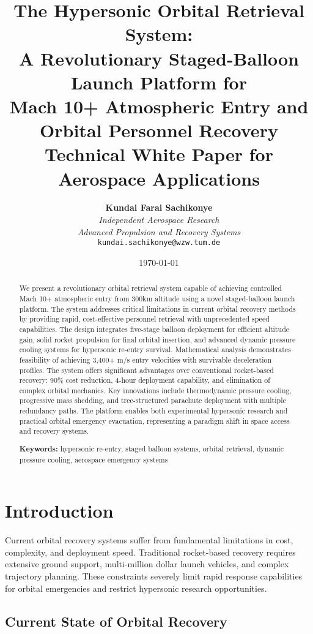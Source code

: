 \documentclass[11pt,a4paper]{article}
\title{
    \textbf{The Hypersonic Orbital Retrieval System:} \\
    \vspace{0.3cm}
    \large{A Revolutionary Staged-Balloon Launch Platform for \\
    Mach 10+ Atmospheric Entry and Orbital Personnel Recovery} \\
    \vspace{0.5cm}
    \normalsize{Technical White Paper for Aerospace Applications}
}
\author{
    \textbf{Kundai Farai Sachikonye} \\
    \textit{Independent Aerospace Research} \\
    \textit{Advanced Propulsion and Recovery Systems} \\
    \texttt{kundai.sachikonye@wzw.tum.de}
}
\date{\today}
\begin{document}
\maketitle

\begin{abstract}
We present a revolutionary orbital retrieval system capable of achieving controlled Mach 10+ atmospheric entry from 300km altitude using a novel staged-balloon launch platform. The system addresses critical limitations in current orbital recovery methods by providing rapid, cost-effective personnel retrieval with unprecedented speed capabilities. The design integrates five-stage balloon deployment for efficient altitude gain, solid rocket propulsion for final orbital insertion, and advanced dynamic pressure cooling systems for hypersonic re-entry survival. Mathematical analysis demonstrates feasibility of achieving 3,400+ m/s entry velocities with survivable deceleration profiles. The system offers significant advantages over conventional rocket-based recovery: 90\% cost reduction, 4-hour deployment capability, and elimination of complex orbital mechanics. Key innovations include thermodynamic pressure cooling, progressive mass shedding, and tree-structured parachute deployment with multiple redundancy paths. The platform enables both experimental hypersonic research and practical orbital emergency evacuation, representing a paradigm shift in space access and recovery systems.

\textbf{Keywords:} hypersonic re-entry, staged balloon systems, orbital retrieval, dynamic pressure cooling, aerospace emergency systems
\end{abstract}

\section{Introduction}

Current orbital recovery systems suffer from fundamental limitations in cost, complexity, and deployment speed. Traditional rocket-based recovery requires extensive ground support, multi-million dollar launch vehicles, and complex trajectory planning. These constraints severely limit rapid response capabilities for orbital emergencies and restrict hypersonic research opportunities.

\subsection{Current State of Orbital Recovery}
\end{document}
